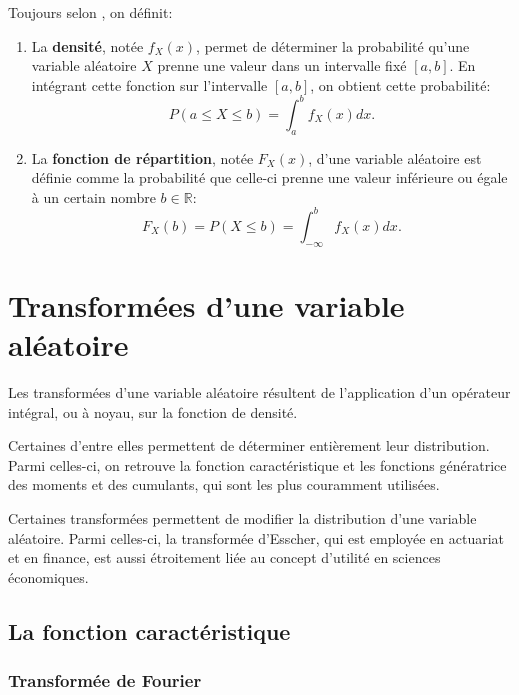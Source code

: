 Toujours selon \cite{dodge2004statistique}, on définit:
\begin{enumerate}
\item La \textbf{densité}, notée $f_X(x)$, permet de déterminer la
  probabilité qu'une variable aléatoire $X$ prenne une valeur dans un
  intervalle fixé $\left[ a,b \right]$. En intégrant cette fonction
  sur l'intervalle $\left[ a,b \right]$, on obtient cette probabilité:
  \begin{equation}
    \label{eq:densitedefinition}
    P(a \leq X \leq b) = \int_{a}^{b} f_X(x) dx.
  \end{equation}
\item La \textbf{fonction de répartition}, notée $F_X(x)$, d’une
  variable aléatoire est définie comme la probabilité que celle-ci
  prenne une valeur inférieure ou égale à un certain nombre $b \in
  \mathbb{R}$:
  \begin{equation}
    \label{eq:repartitiondefinition}
    F_X(b) = P(X \leq b) = \int_{-\infty}^{b} f_X(x) dx.
  \end{equation}
\end{enumerate}


\section{Transformées d'une variable aléatoire}
\label{sec:transformees}

Les transformées d'une variable aléatoire résultent de l'application
d'un opérateur intégral, ou à noyau, sur la fonction de densité.

Certaines d'entre elles permettent de déterminer entièrement leur
distribution. Parmi celles-ci, on retrouve la fonction caractéristique
et les fonctions génératrice des moments et des cumulants, qui sont
les plus couramment utilisées.

Certaines transformées permettent de modifier la distribution d'une
variable aléatoire. Parmi celles-ci, la transformée d'Esscher, qui est
employée en actuariat et en finance, est aussi étroitement liée au
concept d'utilité en sciences économiques.

\subsection{La fonction caractéristique}
\label{sec:fonctioncaract}

\subsubsection{Transformée de Fourier}
\label{sec:transfourier}


